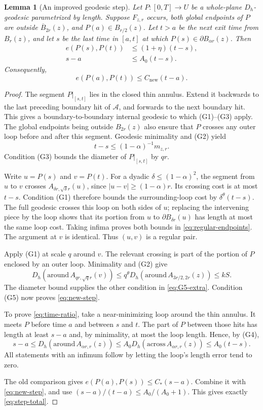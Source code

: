 \documentclass[11pt]{article}
\newtheorem{lemma}[theorem]{Lemma}
\theoremstyle{definition}
\theoremstyle{remark}
\begin{document}
\begin{lemma}[An improved geodesic step]\label{lem:step}
Let $P:[0,T]\to U$ be a whole-plane $D_h$-geodesic
parametrized by length. Suppose $F_{z,r}$ occurs, both global
endpoints of $P$ are outside $\overline B_{2r}(z)$, and
$P(a)\in B_{r/2}(z)$. Let $t>a$ be the next exit time from
$B_r(z)$, and let $s$ be the last time in $[a,t]$ at which
$P(s)\in\partial B_{\alpha r}(z)$. Then
\begin{align}
 e(P(s),P(t))&\le(1+\eta)(t-s),\label{eq:new-step}\\
                    s-a&\le A_0(t-s).\label{eq:time-ratio}
\end{align}
Consequently,
\begin{equation}\label{eq:step-total}
       e(P(a),P(t))\le C_{\mathrm{new}}(t-a).
\end{equation}
\end{lemma}
\begin{proof}
The segment $P|_{[s,t]}$ lies in the closed thin annulus.
Extend it backwards to the last preceding boundary hit of
$\mathcal A$, and forwards to the next boundary hit. This
gives a boundary-to-boundary internal geodesic to which
(G1)--(G3) apply. The global endpoints being outside
$B_{2r}(z)$ also ensure that $P$ crosses any outer loop before
and after this segment. Geodesic minimality and (G2) yield
\[
                    t-s\le(1-\alpha)^{-1}m_{z,r}.
\]
Condition (G3) bounds the diameter of $P|_{[s,t]}$ by $qr$.

Write $u=P(s)$ and $v=P(t)$. For a dyadic
$\delta\le(1-\alpha)^2$, the segment from $u$ to $v$
crosses $A_{\delta r,\sqrt\delta r}(u)$, since
$|u-v|\ge(1-\alpha)r$. Its crossing cost is at most $t-s$.
Condition (G1) therefore bounds the surrounding-loop cost
by $\delta^\theta(t-s)$. The full geodesic crosses this loop
on both sides of $u$; replacing the intervening piece by the
loop shows that its portion from $u$ to
$\partial B_{\delta r}(u)$ has length at most the same loop
cost. Taking infima proves both bounds in
\eqref{eq:regular-endpoints}. The argument at $v$ is identical.
Thus $(u,v)$ is a regular pair.

Apply (G1) at scale $q$ around $v$. The relevant crossing is
part of the portion of $P$ enclosed by an outer loop. Minimality
and (G2) give
\[
 D_h(\mathrm{around}\,A_{qr,\sqrt q r}(v))
 \le q^\theta D_h(\mathrm{around}\,A_{3r/2,2r}(z))
 \le kS.
\]
The diameter bound supplies the other condition in
\eqref{eq:G5-extra}. Condition (G5) now proves
\eqref{eq:new-step}.

To prove \eqref{eq:time-ratio}, take a near-minimizing loop
around the thin annulus. It meets $P$ before time $a$ and
between $s$ and $t$. The part of $P$ between those hits has
length at least $s-a$ and, by minimality, at most the loop
length. Hence, by (G4),
\[
 s-a\le D_h(\mathrm{around}\,A_{\alpha r,r}(z))
       \le A_0D_h(\mathrm{across}\,A_{\alpha r,r}(z))
       \le A_0(t-s).
\]
All statements with an infimum follow by letting the loop's
length error tend to zero.

The old comparison gives $e(P(a),P(s))\le C_*(s-a)$.
Combine it with \eqref{eq:new-step}, and use
$(s-a)/(t-a)\le A_0/(A_0+1)$. This gives exactly
\eqref{eq:step-total}.
\end{proof}
\end{document}
